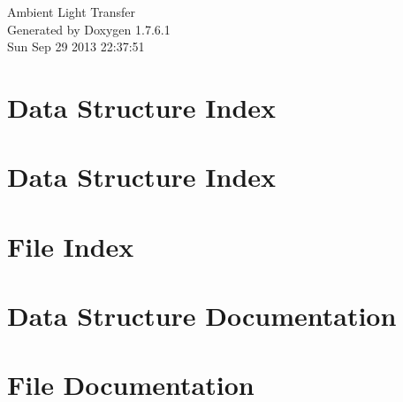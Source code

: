 \documentclass[a4paper]{article}
\begin{document}
\hypersetup{pageanchor=false,citecolor=blue}
\begin{titlepage}
\vspace*{7cm}
\begin{center}
{\Large \-Ambient \-Light \-Transfer }\\
\vspace*{1cm}
{\large \-Generated by Doxygen 1.7.6.1}\\
\vspace*{0.5cm}
{\small Sun Sep 29 2013 22:37:51}\\
\end{center}
\end{titlepage}
\tableofcontents
{}
\hypersetup{pageanchor=true,citecolor=blue}
\section{\-Data \-Structure \-Index}

\section{\-Data \-Structure \-Index}

\section{\-File \-Index}

\section{\-Data \-Structure \-Documentation}






























\section{\-File \-Documentation}


































\printindex
\end{document}
